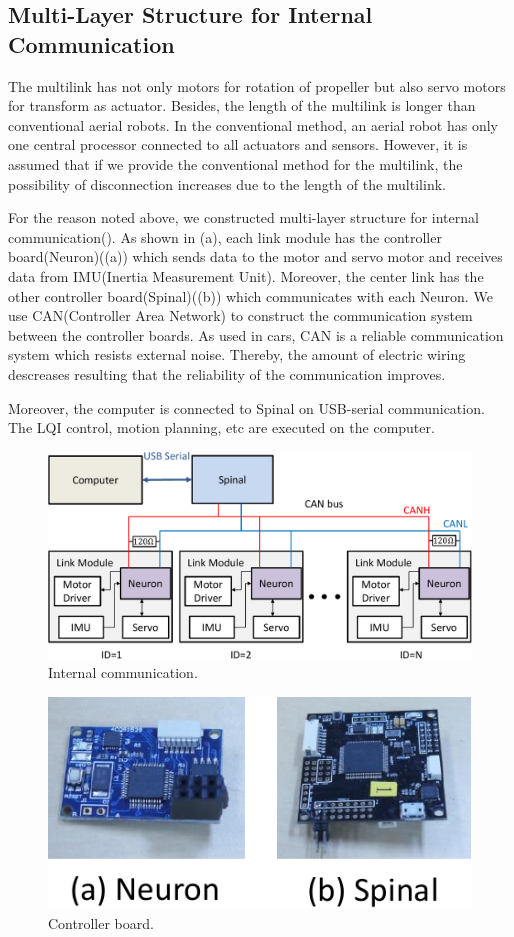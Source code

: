 \subsection{Multi-Layer Structure for Internal Communication}
The multilink has not only motors for rotation of propeller but also servo motors for transform as actuator. Besides, the length of the multilink is longer than conventional aerial robots. In the conventional method, an aerial robot has only one central processor connected to all actuators and sensors. However, it is assumed that if we provide the conventional method for the multilink, the possibility of disconnection increases due to the length of the multilink. 
\par
For the reason noted above, we constructed multi-layer structure for internal communication(). As shown in (a), each link module has the controller board(Neuron)((a)) which sends data to the motor and servo motor and receives data from IMU(Inertia Measurement Unit). Moreover, the center link has the other controller board(Spinal)((b)) which communicates with each Neuron. We use CAN(Controller Area Network) to construct the communication system between the controller boards. As used in cars, CAN is a reliable communication system which resists external noise. Thereby, the amount of electric wiring descreases resulting that the reliability of the communication improves.
\par
Moreover, the computer is connected to Spinal on USB-serial communication. The LQI control, motion planning, etc are executed on the computer.
\begin{figure}[t]
  \begin{center}
    \includegraphics[width=1.0\columnwidth]{figs/internal_communication.pdf}
  \end{center}
  \caption{Internal communication.\label{figure:internal_communication}}
\end{figure}
\begin{figure}[t]
  \begin{center}
    \includegraphics[width=0.8\columnwidth]{figs/controller_board.pdf}
  \end{center}
  \caption{Controller board.\label{figure:controller_board}}
\end{figure}
